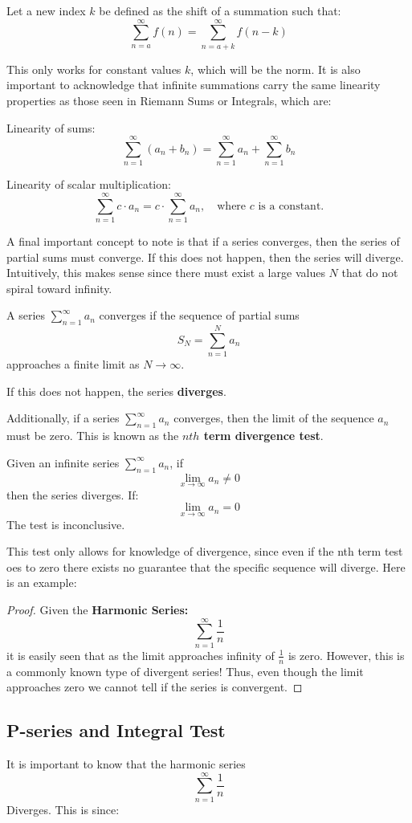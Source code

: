 \documentclass[a4paper, 11pt]{article}
\newenvironment{concept}{%
    \vspace{1em}
    \begin{tcolorbox}[colframe=black!70, colback=white!95, title=Definition]
}{%
    \end{tcolorbox}
    \vspace{1em}
}
\begin{document}
\begin{concept}
    Let a new index $k$ be defined as the shift of a summation such that: 
    \[ \sum_{n=a}^{\infty} f(n) = \sum_{n=a+k}^{\infty} f(n-k)  \]
\end{concept}
This only works for constant values $k$, which will be the norm. It is also important to acknowledge that infinite summations carry the same linearity properties as those seen in Riemann Sums or Integrals, which are: 
\begin{concept}
    Linearity of sums:
\[
\sum_{n=1}^\infty (a_n + b_n) = \sum_{n=1}^\infty a_n + \sum_{n=1}^\infty b_n
\]

Linearity of scalar multiplication:
\[
\sum_{n=1}^\infty c \cdot a_n = c \cdot \sum_{n=1}^\infty a_n, \quad \text{where } c \text{ is a constant.}
\]
\end{concept}
A final important concept to note is that if a series converges, then the series of partial sums must converge. If this does not happen, then the series will diverge. Intuitively, this makes sense since there must exist a large values $N$ that do not spiral toward infinity. 
\begin{concept}
    A series \(\sum_{n=1}^\infty a_n\) converges if the sequence of partial sums
\[
S_N = \sum_{n=1}^N a_n
\]
approaches a finite limit as \(N \to \infty\).

If this does not happen, the series \textbf{diverges}.
\end{concept}
Additionally, if a series \(\sum_{n=1}^\infty a_n\) converges, then the limit of the sequence $a_n$ must be zero. This is known as the \textbf{$nth$ term divergence test}.
\begin{concept}
    Given an infinite series \(\sum_{n=1}^\infty a_n\), if 
    \[ \lim_{x\to\infty} a_n \neq 0\]
    then the series diverges. If:
    \[ \lim_{x\to\infty} a_n = 0\]
    The test is inconclusive.
\end{concept}
This test only allows for knowledge of divergence, since even if the nth term test oes to zero there exists no guarantee that the specific sequence will diverge. Here is an example:
\begin{proof}
Given the \textbf{Harmonic Series:}
\[\sum_{n=1}^\infty \frac{1}{n}\] it is easily seen that as the limit approaches infinity of $\frac{1}{n}$ is zero. However, this is a commonly known type of divergent series! Thus, even though the limit approaches zero we cannot tell if the series is convergent. 
\end{proof}
\subsection{P-series and Integral Test}
It is important to know that the harmonic series 
\[\sum_{n=1}^\infty \frac{1}{n}\] Diverges. This is since: 
\end{document}
